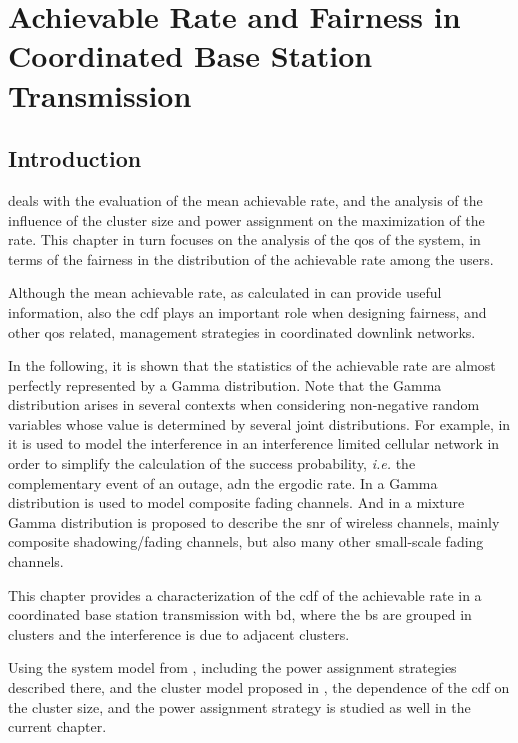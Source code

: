 \chapter[Rate Statistics]{Achievable Rate and Fairness in Coordinated Base Station Transmission}\label{ch:rate_statistics}

\section{Introduction}\label{sec:stats_intro}

 deals with the evaluation of the mean achievable rate,
and the analysis of the influence of the cluster size and power assignment on
the maximization of the rate. This chapter in turn focuses on the analysis of
the \gls{qos} of the system, in terms of the fairness in the distribution of the
achievable rate among the users.

Although the mean achievable rate, as calculated in  can
provide useful information, also the \gls{cdf} plays an important role when
designing fairness, and other \gls{qos} related, management strategies in
coordinated downlink networks.

In the following, it is shown that the statistics of the achievable rate are
almost perfectly represented by a Gamma distribution. Note that the Gamma
distribution arises in several contexts when considering non-negative random
variables whose value is determined by several joint distributions. For example,
in \cite{heath13} it is used to model the interference in an interference
limited cellular network in order to simplify the calculation of the success
probability, \emph{i.e.} the complementary event of an outage, adn the ergodic
rate. In \cite{alahmadi10} a Gamma distribution is used to model composite
fading channels. And in \cite{atapattu11} a mixture Gamma distribution is
proposed to describe the \gls{snr} of wireless channels, mainly composite
shadowing/fading channels, but also many other small-scale fading channels.

This chapter provides a characterization of the \gls{cdf} of the achievable rate
in a coordinated base station transmission with \gls{bd}, where the \gls{bs} are
grouped in clusters and the interference is due to adjacent clusters.

Using the system model from , including the power
assignment strategies described there, and the cluster model proposed in
, the dependence of the \gls{cdf} on the cluster
size, and the power assignment strategy is studied as well in the current
chapter.

